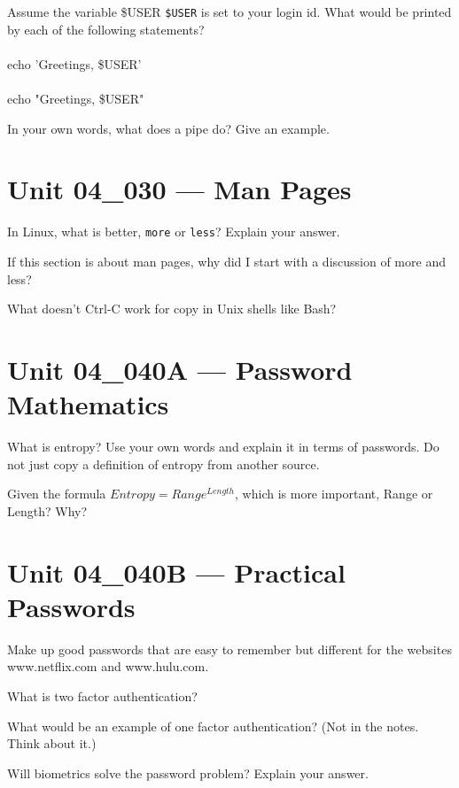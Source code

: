 \documentclass[letterpaper,12pt]{exam}
\newcommand{\unit}{Unit 04}
\begin{document}
\begin {questions}
\begin{samepage}
\begin{checkboxes}
\end{checkboxes}
\end{samepage}

\begin{samepage}
	\question Assume the variable \$USER \texttt{\$USER} is set to your login id.  What would be printed by each of the following statements? 
\\\\
	echo 'Greetings, \$USER'
	\\\\
	echo "Greetings, \$USER"

\end{samepage}

\question In your own words, what does a pipe do?  Give an example. 

\section*{\unit\_030 --- Man Pages} %
 
\question In Linux, what is better, \texttt{more} or \texttt{less}?  Explain your answer. 
\vspace{1.25cm}

\question If this section is about man pages, why did I start with a discussion of more and less? 
\vspace{1.25cm}

\question What doesn't Ctrl-C work for copy in Unix shells like Bash? 

\section*{\unit\_040A --- Password Mathematics} %

\question What is entropy?  Use your own words and explain it in terms of passwords.  Do not just copy a definition of entropy from another source. 
\vspace{1.25cm}

\question Given the formula \(Entropy = Range^{Length} \), which is more important, Range or Length?  Why?

\section*{\unit\_040B --- Practical Passwords} %

\question Make up good passwords that are easy to remember but different for the websites www.netflix.com and www.hulu.com. 
\vspace{1.25cm}

\question What is two factor authentication?
\vspace{1.25cm}

\question What would be an example of one factor authentication?  (Not in the notes.  Think about it.) 
\vspace{1.25cm}

\question Will biometrics solve the password problem?  Explain your answer. 
\vspace{1.25cm}
\end{questions}
\end{document}
